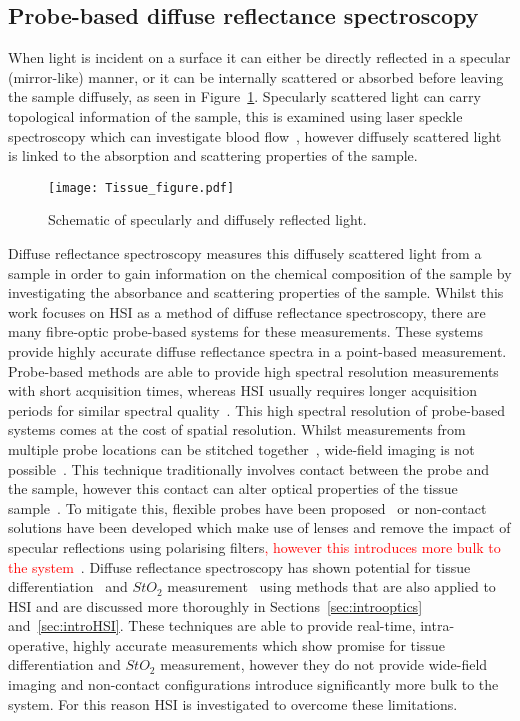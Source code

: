 \subsection{Probe-based diffuse reflectance spectroscopy}
When light is incident on a surface it can either be directly reflected in a specular (mirror-like) manner, or it can be internally scattered or absorbed before leaving the sample diffusely, as seen in Figure~\ref{fig:diffuseR}. Specularly scattered light can carry topological information of the sample, this is examined using laser speckle spectroscopy which can investigate blood flow~\citep{Dunn2012}, however diffusely scattered light is linked to the absorption and scattering properties of the sample. 
\begin{figure}[h]
    \centering
    \texttt{[image: Tissue\_figure.pdf]}
    \caption{Schematic of specularly and diffusely reflected light.}
    \label{fig:diffuseR}
\end{figure}
Diffuse reflectance spectroscopy measures this diffusely scattered light from a sample in order to gain information on the chemical composition of the sample by investigating the absorbance and scattering properties of the sample. Whilst this work focuses on HSI as a method of diffuse reflectance spectroscopy, there are many fibre-optic probe-based systems for these measurements. These systems provide highly accurate diffuse reflectance spectra in a point-based measurement. Probe-based methods are able to provide high spectral resolution measurements with short acquisition times, whereas HSI usually requires longer acquisition periods for similar spectral quality~\citep{Dinish2017}. This high spectral resolution of probe-based systems comes at the cost of spatial resolution. Whilst measurements from multiple probe locations can be stitched together~\citep{Thrapp2020}, wide-field imaging is not possible~\citep{Nishidate2015}. This technique traditionally involves contact between the probe and the sample, however this contact can alter optical properties of the tissue sample~\citep{Miller2017}. To mitigate this, flexible probes have been proposed~\citep{Miller2017} or non-contact solutions have been developed which make use of lenses and remove the impact of specular reflections using polarising filters\textcolor{red}{, however this introduces more bulk to the system}~\citep{Bish2011, Zhu2012}. %
Diffuse reflectance spectroscopy has shown potential for tissue differentiation~\citep{Skyrman2022} and $StO_2$ measurement~\citep{Fredriksson2020} using methods that are also applied to HSI and are discussed more thoroughly in Sections~\ref{sec:introoptics} and~\ref{sec:introHSI}. These techniques are able to provide real-time, intra-operative, highly accurate measurements which show promise for tissue differentiation and $StO_2$ measurement, however they do not provide wide-field imaging and non-contact configurations introduce significantly more bulk to the system. For this reason HSI is investigated to overcome these limitations. 

